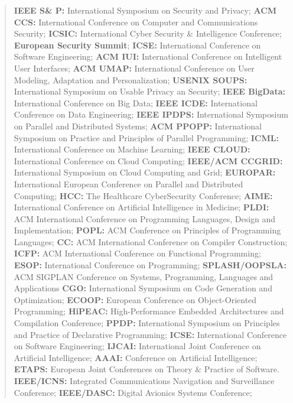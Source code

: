\documentclass[a4paper,11pt]{article}
\begin{document}
\begin{quote}
\textbf{IEEE S\& P:} International Symposium on Security and Privacy;
\textbf{ACM CCS:} International Conference on Computer and Communications Security;
\textbf{ICSIC:} International Cyber Security \& Intelligence Conference;
\textbf{European Security Summit};
\textbf{ICSE:} International Conference on Software Engineering;
\textbf{ACM IUI:} International Conference on Intelligent User Interfaces;
\textbf{ACM UMAP:} International Conference on User Modeling, Adaptation and Personalization;
\textbf{USENIX SOUPS:} International Symposium on Usable Privacy an Security;
\textbf{IEEE BigData:} International Conference on Big Data;
\textbf{IEEE ICDE:} International Conference on Data Engineering;
\textbf{IEEE IPDPS:} International Symposium on Parallel and Distributed Systems;
\textbf{ACM PPOPP:} International Symposium on Practice and Principles of Parallel Programming;
\textbf{ICML:} International Conference on Machine Learning;
\textbf{IEEE CLOUD:} International Conference on Cloud Computing;
\textbf{IEEE/ACM CCGRID:} International Symposium on Cloud Computing and Grid;
\textbf{EUROPAR:} International European Conference on Parallel and Distributed Computing; 
\textbf{HCC:} The Healthcare CyberSecurity Conference;
\textbf{AIME:} International Conference on Artificial Intelligence in Medicine;
\textbf{PLDI: } ACM International Conference on Programming Languages, Design and Implementation;
\textbf{POPL: } ACM Conference on Principles of Programming Languages;
\textbf{CC: } ACM International Conference on Compiler Construction;
\textbf{ICFP: } ACM International Conference on Functional Programming;
\textbf{ESOP: } International Conference on Programming;
\textbf{SPLASH/OOPSLA: } ACM SIGPLAN Conference on Systems, Programming, Languages and Applications
\textbf{CGO: } International Symposium on Code Generation and Optimization;
\textbf{ ECOOP: } European Conference on Object-Oriented Programming;
\textbf{HiPEAC: } High-Performance Embedded Architectures and Compilation Conference;
\textbf{PPDP: } International Symposium on
Principles and Practice of Declarative Programming;
\textbf{ICSE: } International Conference on Software Engineering;
\textbf{IJCAI:} International Joint Conference on Artificial Intelligence;
\textbf{AAAI:} Conference on Artificial Intelligence;
\textbf{ETAPS:} European Joint Conferences on Theory \& Practice of Software.
\textbf{IEEE/ICNS:} Integrated Communications Navigation and Surveillance Conference;
\textbf{IEEE/DASC:} Digital Avionics Systems Conference;

 \end{quote}
\end{document}
